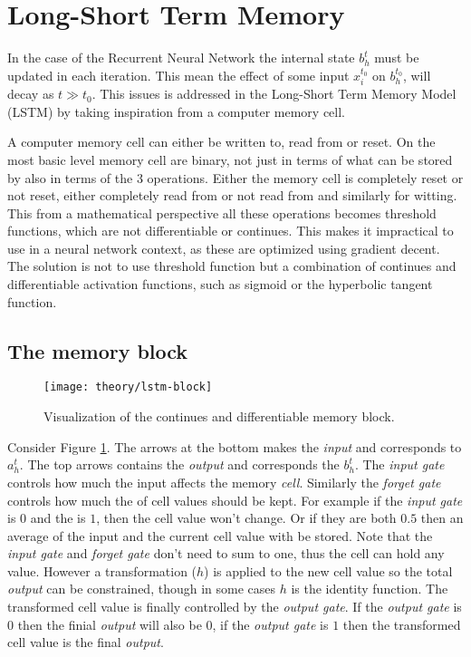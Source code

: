 
\section{Long-Short Term Memory}

In the case of the Recurrent Neural Network the internal state $b_h^t$ must be updated in each iteration. This mean the effect of some input $x_i^{t_0}$ on $b_h^{t_0}$, will decay as $t \gg t_0$. This issues is addressed in the Long-Short Term Memory Model (LSTM) by taking inspiration from a computer memory cell.

A computer memory cell can either be written to, read from or reset. On the most basic level memory cell are binary, not just in terms of what can be stored by also in terms of the 3 operations. Either the memory cell is completely reset or not reset, either completely read from or not read from and similarly for witting. This from a mathematical perspective all these operations becomes threshold functions, which are not differentiable or continues. This makes it impractical to use in a neural network context, as these are optimized using gradient decent. The solution is not to use threshold function but a combination of continues and differentiable activation functions, such as sigmoid or the hyperbolic tangent function.

\subsection{The memory block}

\begin{figure}[h]
	\centering
	\texttt{[image: theory/lstm-block]}
	\caption{Visualization of the continues and differentiable memory block.}
	\label{fig:theory:lstm:lstm-block}
\end{figure}

Consider Figure \ref{fig:theory:lstm:lstm-block}. The arrows at the bottom makes the \textit{input} and corresponds to $a_h^t$. The top arrows contains the \textit{output} and corresponds the $b_h^t$. The \textit{input gate} controls how much the input affects the memory \textit{cell}. Similarly the \textit{forget gate} controls how much the of cell values should be kept. For example if the \textit{input gate} is $0$ and the  is $1$, then the cell value won't change. Or if they are both $0.5$ then an average of the input and the current cell value with be stored. Note that the \textit{input gate} and \textit{forget gate} don't need to sum to one, thus the cell can hold any value. However a transformation ($h$) is applied to the new cell value so the total \textit{output} can be constrained, though in some cases $h$ is the identity function. The transformed cell value is finally controlled by the \textit{output gate}. If the \textit{output gate} is $0$ then the finial \textit{output} will also be $0$, if the \textit{output gate} is $1$ then the transformed cell value is the final \textit{output}.

